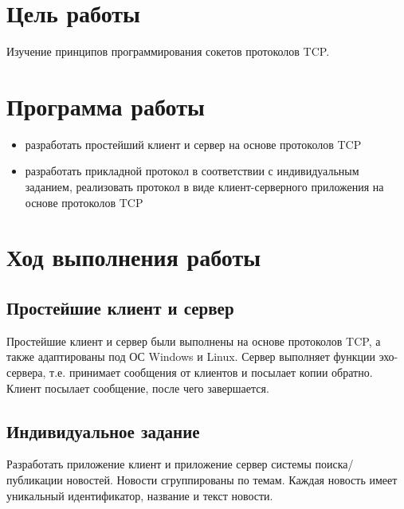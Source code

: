
\section{Цель работы}
Изучение принципов программирования сокетов протоколов TCP.

\section{Программа работы}
\begin{itemize}
\item разработать простейший клиент и сервер на основе протоколов TCP 
\item разработать прикладной протокол в соответствии с индивидуальным заданием, реализовать протокол в виде клиент-серверного приложения на основе протоколов TCP
\end{itemize}

\section{Ход выполнения работы}

\subsection{Простейшие клиент и сервер}
Простейшие клиент и сервер были выполнены на основе протоколов TCP, а также адаптированы под ОС Windows и Linux. Сервер выполняет функции эхо-сервера, т.е. принимает сообщения от клиентов и посылает копии обратно. Клиент посылает сообщение, после чего завершается.

\subsection{Индивидуальное задание}
Разработать приложение клиент и приложение сервер системы поиска/публикации новостей. Новости сгруппированы по темам. Каждая новость имеет уникальный идентификатор, название и текст новости.

